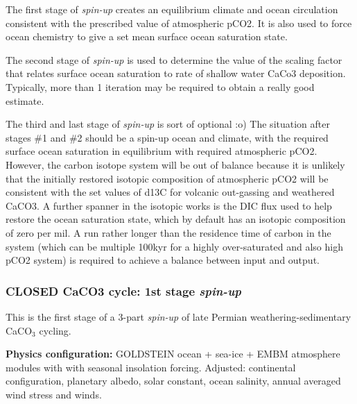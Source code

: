 \documentclass[10pt,twoside]{article}
\begin{document}
        \begin{compactenum}
        
                \item The first stage of \textit{spin-up} creates an equilibrium climate and ocean circulation consistent with the prescribed value of atmospheric pCO2. It is also used to force ocean chemistry to give a set mean surface ocean saturation state.
                
                \item The second stage of \textit{spin-up} is used to determine the value of the scaling factor that relates surface ocean saturation to rate of shallow water CaCo3 deposition. Typically, more than 1 iteration may be required to obtain a really good estimate.
                
                \item The third and last stage of \textit{spin-up} is sort of optional :o) The situation after stages \#1 and \#2 should be a spin-up ocean and climate, with the required surface ocean saturation in equilibrium with required atmospheric pCO2. However, the carbon isotope system will be out of balance because it is unlikely that the initially restored isotopic composition of atmospheric pCO2 will be consistent with the set values of d13C for volcanic out-gassing and weathered CaCO3. A further spanner in the isotopic works is the DIC flux used to help restore the ocean saturation state, which by default has an isotopic composition of zero per mil. A run rather longer than the residence time of carbon in the system (which can be multiple 100kyr for a highly over-saturated and also high pCO2 system) is required to achieve a balance between input and output.
                
        \end{compactenum}


\subsubsection{CLOSED CaCO3 cycle: 1st stage \textit{spin-up}}\label{EXAMPLE.p0251b.PO4.SPIN0}

This is the first stage of a 3-part \textsl{spin-up} of late Permian weathering-sedimentary CaCO$_{3}$ cycling.

\noindent \textbf{Physics configuration:} GOLDSTEIN ocean + sea-ice + EMBM atmosphere modules with with seasonal insolation forcing. Adjusted: continental configuration, planetary albedo, solar constant, ocean salinity, annual averaged wind stress and winds.
\end{document}
